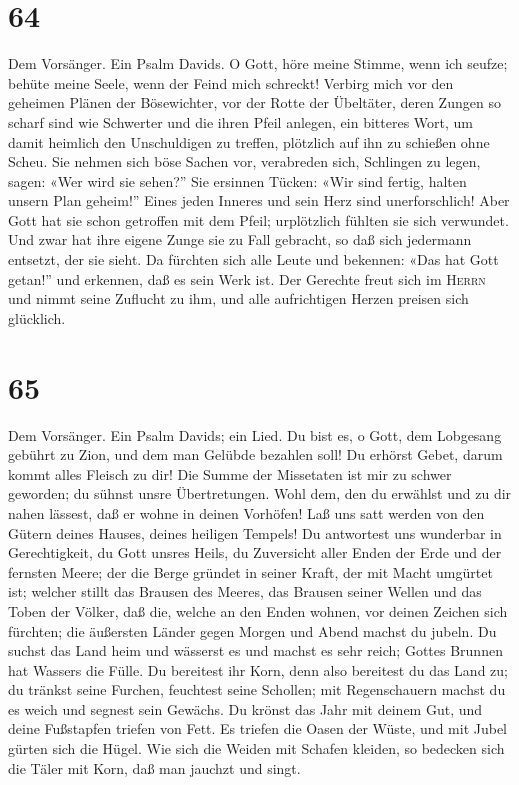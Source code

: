\hypertarget{section-63}{%
\section{64}\label{section-63}}

 Dem Vorsänger. Ein Psalm Davids. O Gott, höre meine
Stimme, wenn ich seufze; behüte meine Seele, wenn der Feind mich
schreckt!  Verbirg mich vor den geheimen Plänen der
Bösewichter, vor der Rotte der Übeltäter,  deren Zungen so
scharf sind wie Schwerter und die ihren Pfeil anlegen, ein bitteres
Wort,  um damit heimlich den Unschuldigen zu treffen,
plötzlich auf ihn zu schießen ohne Scheu.  Sie nehmen sich
böse Sachen vor, verabreden sich, Schlingen zu legen, sagen: «Wer wird
sie sehen?''  Sie ersinnen Tücken: «Wir sind fertig,
halten unsern Plan geheim!'' Eines jeden Inneres und sein Herz sind
unerforschlich!  Aber Gott hat sie schon getroffen mit dem
Pfeil; urplötzlich fühlten sie sich verwundet.  Und zwar
hat ihre eigene Zunge sie zu Fall gebracht, so daß sich jedermann
entsetzt, der sie sieht.  Da fürchten sich alle Leute und
bekennen: «Das hat Gott getan!'' und erkennen, daß es sein Werk ist.
 Der Gerechte freut sich im \textsc{Herrn} und nimmt
seine Zuflucht zu ihm, und alle aufrichtigen Herzen preisen sich
glücklich.

\hypertarget{section-64}{%
\section{65}\label{section-64}}

 Dem Vorsänger. Ein Psalm Davids; ein Lied. Du bist es, o
Gott, dem Lobgesang gebührt zu Zion, und dem man Gelübde bezahlen soll!
 Du erhörst Gebet, darum kommt alles Fleisch zu dir!
 Die Summe der Missetaten ist mir zu schwer geworden; du
sühnst unsre Übertretungen.  Wohl dem, den du erwählst und
zu dir nahen lässest, daß er wohne in deinen Vorhöfen! Laß uns satt
werden von den Gütern deines Hauses, deines heiligen Tempels!
 Du antwortest uns wunderbar in Gerechtigkeit, du Gott
unsres Heils, du Zuversicht aller Enden der Erde und der fernsten Meere;
 der die Berge gründet in seiner Kraft, der mit Macht
umgürtet ist;  welcher stillt das Brausen des Meeres, das
Brausen seiner Wellen und das Toben der Völker,  daß die,
welche an den Enden wohnen, vor deinen Zeichen sich fürchten; die
äußersten Länder gegen Morgen und Abend machst du jubeln. 
Du suchst das Land heim und wässerst es und machst es sehr reich; Gottes
Brunnen hat Wassers die Fülle. Du bereitest ihr Korn, denn also
bereitest du das Land zu;  du tränkst seine Furchen,
feuchtest seine Schollen; mit Regenschauern machst du es weich und
segnest sein Gewächs.  Du krönst das Jahr mit deinem Gut,
und deine Fußstapfen triefen von Fett.  Es triefen die
Oasen der Wüste, und mit Jubel gürten sich die Hügel. 
Wie sich die Weiden mit Schafen kleiden, so bedecken sich die Täler mit
Korn, daß man jauchzt und singt.

